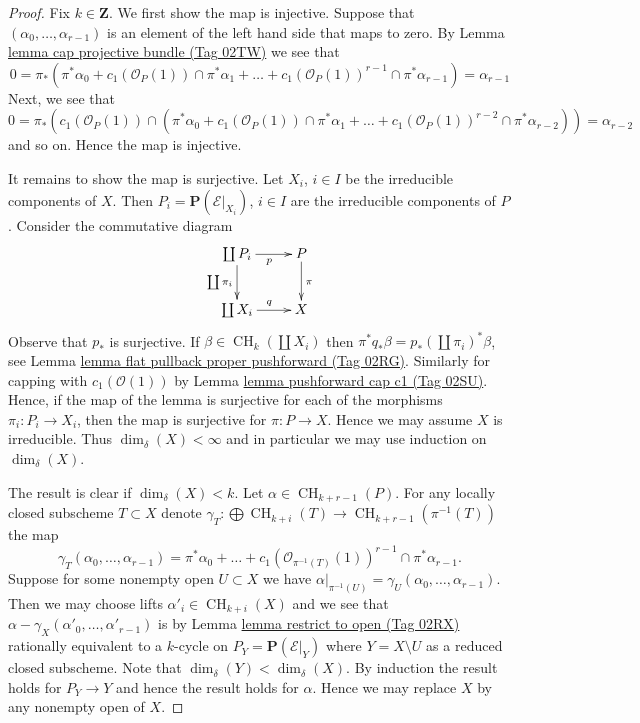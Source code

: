\documentclass{amsart}
\theoremstyle{plain}
\theoremstyle{definition}
\theoremstyle{remark}
\numberwithin{equation}{subsection}
\def\CH{\mathop{\mathrm{CH}}\nolimits}
\begin{document}
\begin{proof}
Fix $k \in \mathbf{Z}$. We first show the map is injective.
Suppose that $(\alpha_0, \ldots, \alpha_{r - 1})$ is an element
of the left hand side that maps to zero.
By Lemma \href{https://stacks.math.columbia.edu/tag/02TW}{lemma cap projective bundle (Tag 02TW)} we see that
$$
0 = \pi_*(\pi^*\alpha_0 +
c_1(\mathcal{O}_P(1)) \cap \pi^*\alpha_1
+ \ldots +
c_1(\mathcal{O}_P(1))^{r - 1} \cap \pi^*\alpha_{r-1})
= \alpha_{r - 1}
$$
Next, we see that
$$
0 = \pi_*(c_1(\mathcal{O}_P(1)) \cap (\pi^*\alpha_0 +
c_1(\mathcal{O}_P(1)) \cap \pi^*\alpha_1
+ \ldots +
c_1(\mathcal{O}_P(1))^{r - 2} \cap \pi^*\alpha_{r - 2}))
= \alpha_{r - 2}
$$
and so on. Hence the map is injective.

\medskip\noindent
It remains to show the map is surjective.
Let $X_i$, $i \in I$ be the irreducible components of $X$.
Then $P_i = \mathbf{P}(\mathcal{E}|_{X_i})$, $i \in I$
are the irreducible components of $P$. Consider the commutative
diagram
$$
\xymatrix{
\coprod P_i \ar[d]_{\coprod \pi_i} \ar[r]_p & P \ar[d]^\pi \\
\coprod X_i \ar[r]^q & X
}
$$
Observe that $p_*$ is surjective. If $\beta \in \CH_k(\coprod X_i)$
then $\pi^* q_* \beta = p_*(\coprod \pi_i)^* \beta$, see
Lemma \href{https://stacks.math.columbia.edu/tag/02RG}{lemma flat pullback proper pushforward (Tag 02RG)}. Similarly for
capping with $c_1(\mathcal{O}(1))$ by
Lemma \href{https://stacks.math.columbia.edu/tag/02SU}{lemma pushforward cap c1 (Tag 02SU)}.
Hence, if the map of the lemma is surjective for each
of the morphisms $\pi_i : P_i \to X_i$, then the map is
surjective for $\pi : P \to X$. Hence we may assume $X$ is irreducible.
Thus $\dim_\delta(X) < \infty$ and in particular we may use
induction on $\dim_\delta(X)$.

\medskip\noindent
The result is clear if $\dim_\delta(X) < k$.
Let $\alpha \in \CH_{k + r - 1}(P)$.
For any locally closed subscheme $T \subset X$ denote
$\gamma_T : \bigoplus \CH_{k + i}(T) \to \CH_{k + r - 1}(\pi^{-1}(T))$
the map
$$
\gamma_T(\alpha_0, \ldots, \alpha_{r - 1})
= \pi^*\alpha_0 + \ldots +
c_1(\mathcal{O}_{\pi^{-1}(T)}(1))^{r - 1} \cap \pi^*\alpha_{r - 1}.
$$
Suppose for some nonempty open $U \subset X$ we have
$\alpha|_{\pi^{-1}(U)} = \gamma_U(\alpha_0, \ldots, \alpha_{r - 1})$.
Then we may choose lifts $\alpha'_i \in \CH_{k + i}(X)$ and we
see that $\alpha - \gamma_X(\alpha'_0, \ldots, \alpha'_{r - 1})$
is by Lemma \href{https://stacks.math.columbia.edu/tag/02RX}{lemma restrict to open (Tag 02RX)}
rationally equivalent to a $k$-cycle on $P_Y = \mathbf{P}(\mathcal{E}|_Y)$
where $Y = X \setminus U$ as a reduced closed subscheme.
Note that $\dim_\delta(Y) < \dim_\delta(X)$.
By induction the result holds
for $P_Y \to Y$ and hence the result holds for $\alpha$.
Hence we may replace $X$ by any nonempty open of $X$.


\end{proof}
\end{document}
